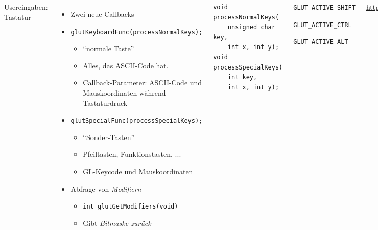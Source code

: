 \begin{frame}[fragile]
%
\begin{columns}[T]
\begin{Large}
{Usereingaben: Tastatur}
\vspace{10pt}
\end{Large}
%
\begin{itemize}
\item Zwei neue Callbacks
\item \texttt{glutKeyboardFunc(processNormalKeys);}
	\begin{itemize}
	\item \enquote{normale Taste}
	\item Alles, das ASCII-Code hat.
	\item Callback-Parameter: ASCII-Code und Mauskoordinaten während Tastaturdruck
	\end{itemize}
\item \texttt{glutSpecialFunc(processSpecialKeys);}
	\begin{itemize}
	\item \enquote{Sonder-Tasten}
	\item Pfeiltasten, Funktionstasten, ...
	\item GL-Keycode und Mauskoordinaten
	\end{itemize}
\item Abfrage von \emph{Modifiern}
	\begin{itemize}
	\item \texttt{int glutGetModifiers(void)}
	\item Gibt \emph{Bitmaske zurück}
	\end{itemize}
\end{itemize}
%
\begin{codebox}
\begin{verbatim}
void processNormalKeys(
    unsigned char key, 
    int x, int y);
void processSpecialKeys(
    int key, 
    int x, int y);
\end{verbatim}
\end{codebox}
%
\begin{itembox}
\footnotesize
	\item \texttt{GLUT\_ACTIVE\_SHIFT}
	\item \texttt{GLUT\_ACTIVE\_CTRL}
	\item \texttt{GLUT\_ACTIVE\_ALT}
\end{itembox}
{\tiny\url{https://www.opengl.org/resources/libraries/glut/spec3/node73.html}}
\end{columns}
%
\end{frame}

